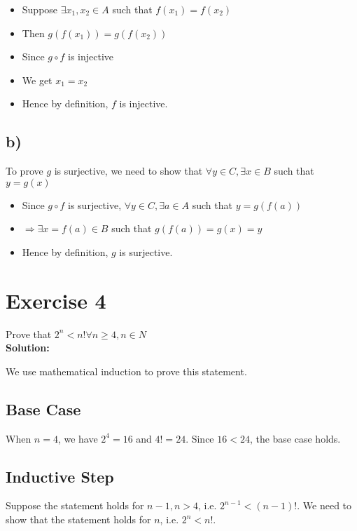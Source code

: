 \documentclass{article}
\begin{document}
\begin{itemize}
    \item Suppose $\exists x_1, x_2 \in A$ such that $f(x_1) = f(x_2)$
    \item Then $g(f(x_1)) = g(f(x_2))$
    \item Since $g \circ f$ is injective
    \item We get $x_1 = x_2$
    \item Hence by definition, $f$ is injective.
\end{itemize}    

\subsection*{b)}

To prove $g$ is surjective, we need to show that $\forall y \in C, \exists x \in B$ such that $y = g(x)$

\begin{itemize}
    \item Since $g \circ f$ is surjective, $\forall y \in C, \exists a \in A$ such that $y = g(f(a))$
    \item $\Rightarrow \exists x = f(a) \in B$ such that $g(f(a)) = g(x) = y$
    \item Hence by definition, $g$ is surjective.
\end{itemize}

\newpage

\section*{Exercise 4}

Prove that $2^n < n! \forall n \geq 4, n \in N$ \\

\textbf{Solution:}

We use mathematical induction to prove this statement.

\subsection*{Base Case}

When $n = 4$, we have $2^4 = 16$ and $4! = 24$. Since $16 < 24$, the base case holds.

\subsection*{Inductive Step}

Suppose the statement holds for $n-1, n > 4$, i.e. $2^{n-1} < (n-1)!$. We need to show that the statement holds for $n$, i.e. $2^n < n!$.
\end{document}
